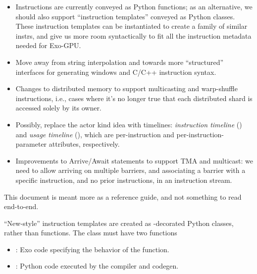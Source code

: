 \begin{itemize}
\item Instructions are currently conveyed as Python functions; as an alternative, we should also support ``instruction templates'' conveyed as Python classes.
These instruction templates can be instantiated to create a family of similar instrs, and give us more room syntactically to fit all the instruction metadata needed for Exo-GPU.
\item Move away from string interpolation and towards more ``structured'' interfaces for generating windows and C/C++ instruction syntax.
\item Changes to distributed memory to support multicasting and warp-shuffle instructions, i.e., cases where it's no longer true that each distributed shard is accessed solely by its owner.
\item Possibly, replace the actor kind idea with timelines: \textit{instruction timeline} () and \textit{usage timeline} (), which are per-instruction and per-instruction-parameter attributes, respectively.
\item Improvements to Arrive/Await statements to support TMA and multicast: we need to allow arriving on multiple barriers, and associating a barrier with a specific instruction, and no prior instructions, in an instruction stream.
\end{itemize}

\filbreak
{}

This document is meant more as a reference guide, and not something to read end-to-end.

{\sffamily
{}






}

\newpage
{}
\label{ch:InstrClass}

``New-style'' instruction templates are created as -decorated Python classes, rather than functions.
The class must have two functions
\begin{itemize}
  \item {}: Exo code specifying the behavior of the function.
  \item {}: Python code executed by the compiler and codegen.
\end{itemize}

